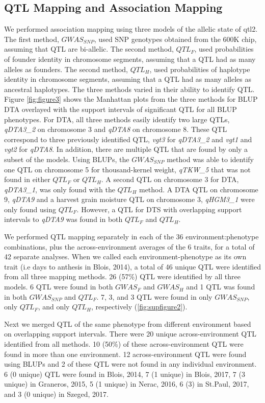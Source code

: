 \documentclass[article,9pt,twocolumn,twoside]{rilabRxiv}
\begin{document}
\subsection{QTL Mapping and Association Mapping}
We performed association mapping using three models of the allelic state of qtl2.
The first method, $GWAS_{SNP}$, used SNP genotypes obtained from the 600K chip, assuming that QTL are bi-allelic.
The second method, $QTL_F$, used probabilities of founder identity in chromosome segments, assuming that a QTL had as many alleles as founders.
The second method, $QTL_H$, used probabilities of haplotype identity in chromosome segments, assuming that a QTL had as many alleles as ancestral haplotypes.
The three methods varied in their ability to identify QTL.
Figure \ref{fig:figure3} shows the Manhattan plots from the three methods for BLUP DTA overlayed with the support intervals of significant QTL for all BLUP phenotypes.
For DTA, all three methods easily identify two large QTLs, \emph{qDTA3\_2} on chromosome 3 and \emph{qDTA8} on chromosome 8. These QTL correspond to three previously identified QTL, \emph{vgt3} for \emph{qDTA3\_2} and \emph{vgt1} and \emph{vgt2} for \emph{qDTA8}.
In addition, there are multiple QTL that are found by only a subset of the models.
Using BLUPs, the $GWAS_{SNP}$ method was able to identify one QTL on chromosome 5 for thousand-kernel weight, \emph{qTKW\_5} that was not found in either $QTL_F$ or $QTL_H$.
A second QTL on chromosome 3 for DTA, \emph{qDTA3\_1}, was only found with the $QTL_H$ method.
A DTA QTL on chromosome 9, \emph{qDTA9} and a harvest grain moisture QTL on chromosome 3, \emph{qHGM3\_1} were only found using $QTL_F$.
However, a QTL for DTS with overlapping support intervals to \emph{qDTA9} was found in both $QTL_F$ and $QTL_H$.

We performed QTL mapping separately in each of the 36 environment:phenotype combinations, plus the across-environment averages of the 6 traits, for a total of 42 separate analyses.
When we called each environment-phenotype as its own trait (i.e days to anthesis in Blois, 2014), a total of 46 unique QTL were identified from all three mapping methods.
26 (57\%) QTL were identified by all three models.
6 QTL were found in both $GWAS_F$ and $GWAS_H$ and 1 QTL was found in both $GWAS_{SNP}$ and $QTL_F$.
7, 3, and 3 QTL were found in only $GWAS_{SNP}$, only $QTL_F$, and only $QTL_H$, respectively (\ref{fig:supfigure2}).

Next we merged QTL of the same phenotype from different environment based on overlapping support intervals.
There were 20 unique across-environment QTL identified from all methods.
10 (50\%) of these across-environment QTL were found in more than one environment.
12 across-environment QTL were found using BLUPs and 2 of these QTL were not found in any individual environment.
6 (0 unique) QTL were found in Blois, 2014, 7 (1 unique) in Blois, 2017, 7 (3 unique) in Graneros, 2015, 5 (1 unique) in Nerac, 2016, 6 (3) in St.Paul, 2017, and 3 (0 unique) in Szeged, 2017.
\end{document}
